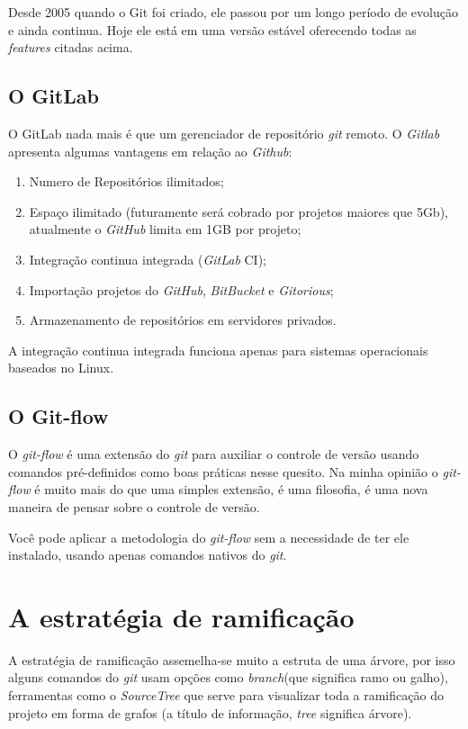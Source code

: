 \documentclass[12pt,openright,oneside,a4paper,english,brazil]{abntex2}
\begin{document}
Desde 2005 quando o Git foi criado, ele passou por um longo período de evolução e ainda continua. Hoje ele está em uma versão estável oferecendo todas as \textit{features} citadas acima.

\section{O GitLab \label{gitlab}}

O GitLab nada mais é que um gerenciador de repositório \textit{git} remoto. O \textit{Gitlab} apresenta algumas vantagens em relação ao \textit{Github}:

\begin{enumerate}
	\item Numero de Repositórios ilimitados;
	\item Espaço ilimitado (futuramente será cobrado por projetos maiores que 5Gb), atualmente o \textit{GitHub} limita em 1GB por projeto;
	\item Integração continua integrada (\textit{GitLab} CI);
	\item Importação projetos do \textit{GitHub}, \textit{BitBucket} e \textit{Gitorious};
	\item Armazenamento de repositórios em servidores privados.
\end{enumerate}

A integração continua integrada funciona apenas para sistemas operacionais baseados no Linux.

\section{O Git-flow \label{git-flow}}
O \textit{git-flow}  é uma extensão do \textit{git} para auxiliar o controle de versão usando comandos pré-definidos como boas práticas nesse quesito. Na minha opinião o \textit{git-flow}  é muito mais do que uma simples extensão, é uma filosofia, é uma nova maneira de pensar sobre o controle de versão. 

Você pode aplicar a metodologia do \textit{git-flow}  sem a necessidade de ter ele instalado, usando apenas comandos nativos do \textit{git}. 

\chapter{A estratégia de ramificação \label{ramificacao}}
A estratégia de ramificação assemelha-se muito a estruta de uma árvore, por isso alguns comandos do \textit{git} usam opções como \textit{branch}(que significa ramo ou galho), ferramentas como o \textit{SourceTree} que serve para visualizar toda a ramificação do projeto em forma de grafos (a título de informação, \textit{tree} significa árvore).
\end{document}
